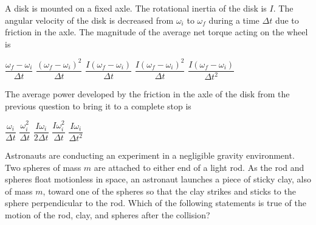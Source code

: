 \documentclass{../../oss-classkick-exam}
\begin{document}
\begin{multicols*}{2}
\begin{questions}
    \question A disk is mounted on a fixed axle. The rotational inertia of the
    disk is $I$. The angular velocity of the disk is decreased from $\omega_i$
    to $\omega_f$ during a time $\Delta t$ due to friction in the axle. The
    magnitude of the average net torque acting on the wheel is
    \begin{choices}
      \choice $\dfrac{\omega_f-\omega_i}{\Delta t}$
      \choice $\dfrac{(\omega_f-\omega_i)^2}{\Delta t}$
      \choice $\dfrac{I(\omega_f-\omega_i)}{\Delta t}$
      \choice $\dfrac{I(\omega_f-\omega_i)^2}{\Delta t}$
      \choice $\dfrac{I(\omega_f-\omega_i)}{\Delta t^2}$
    \end{choices}
    \vspace{.7in}
    
  \question The average power developed by the friction in the axle of the disk
    from the previous question to bring it to a complete stop is
    \begin{choices}
      \choice $\dfrac{\omega_i}{\Delta t}$
      \choice $\dfrac{\omega_i^2}{\Delta t}$
      \choice $\dfrac{I\omega_i}{2\Delta t}$
      \choice $\dfrac{I\omega_i^2}{\Delta t}$
      \choice $\dfrac{I\omega_i}{\Delta t^2}$
    \end{choices}    
    \columnbreak
    
    \question Astronauts are conducting an experiment in a negligible gravity
    environment. Two spheres of mass $m$ are attached to either end of a light
    rod. As the rod and spheres float motionless in space, an astronaut
    launches a piece of sticky clay, also of mass $m$, toward one of the spheres
    so that the clay strikes and sticks to the sphere perpendicular to the rod.
    Which of the following statements is true of the motion of the rod, clay,
    and spheres after the collision?
    \begin{center}
\end{center}
\end{questions}
\end{multicols*}
\end{document}
